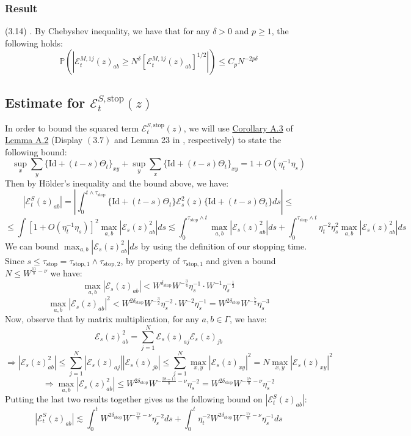 \documentclass[11pt]{article}
\newcommand{\E}{\mathcal{E}}
\newcommand{\sto}{\text{stop}}
\begin{document}
\subsubsection*{Result}
(3.14) \cite{bandSDE}. By Chebyshev inequality, we have that for any $\delta>0$ and $p\geq 1$, the following holds: 
$$\mathbb{P}\left(\left\vert \E_t^{M, 1j}(z)_{ab}\geq N^\delta [\E_t^{M, 1j}(z)_{ab}]^{1/2}\right\vert\right)\leq C_p N^{-2p\delta}$$

\subsection{Estimate for $\E_t^{S, \text{stop}}(z)$}

In order to bound the squared term $\E_t^{S, \sto}(z)$, we will use \hyperref[cor-a3]{Corollary A.3} of \hyperref[lemma-a2]{Lemma A.2} (Display $(3.7)$ and Lemma 23 in \cite{bandSDE}, respectively) to state the following  bound: $$\sup_x \sum_y \{\text{Id}+(t-s)\Theta_t\}_{xy}+\sup_y \sum_x \{\text{Id}+(t-s)\Theta_t\}_{xy} = 1+O(\eta_t^{-1}\eta_s)$$
Then by Hölder's inequality and the bound above, we have: $$|\E_t^{S}(z)_{ab}|=\left\vert\int_0^{t\wedge \tau_\sto} \{\text{Id} + (t-s)\Theta_t\}\E_s^2(z) \{\text{Id} + (t-s)\Theta_t\}ds\right\vert \leq$$
$$\leq \int \left[1+O(\eta_t^{-1}\eta_s)\right]^2 \max_{a, b}|\E_s(z)_{ab}^2|ds \lesssim \int_0^{\tau_\sto \wedge t} \max_{a, b}|\E_s(z)_{ab}^2|ds + \int_0^{\tau_\sto \wedge t}\eta_t^{-2}\eta_s^{2} \max_{a, b}|\E_s(z)^2_{ab}|ds$$
We can bound $\max_{a, b}|\E_s(z)_{ab}^2|ds$ by using the definition of our stopping time. Since $s\leq \tau_\sto = \tau_{\sto, 1}\wedge \tau_{\sto, 2}$, by property of $\tau_{\sto, 1}$ and given a bound $N\leq W^{\frac{11}{8}-\nu}$ we have: $$\max_{a, b}|\E_s(z)_{ab}|<W^{\delta_\sto} W^{-\frac{3}{4}} \eta_s^{-1}\cdot W^{-1}\eta_s^{-\frac{1}{2}}$$
$$\max_{a, b}|\E_s(z)_{ab}|^2<W^{2\delta_\sto} W^{-\frac{3}{2}} \eta_s^{-2}\cdot W^{-2}\eta_s^{-1}=W^{2\delta_{\sto}} W^{-\frac{7}{2}}\eta_s^{-3} $$
Now, observe that by matrix multiplication, for any $a, b\in \Gamma$, we have: $$\E_s(z)^2_{ab} = \sum_{j=1}^N \E_s(z)_{aj}\E_s(z)_{jb}$$
$$\Rightarrow |\E_s(z)_{ab}^2|\leq \sum_{j=1}^N |\E_s(z)_{aj}||\E_s(z)_{jb}|\leq \sum_{j=1}^N \max_{x,y}|\E_s(z)_{xy}|^2 = N\max_{x,y}|\E_s(z)_{xy}|^2$$
$$\Rightarrow \max_{a,b}|\E_s(z)^2_{ab}|\leq W^{2\delta_\sto}W^{-\frac{28-11}{8}-\nu}\eta_s^{-2} = W^{2\delta_\sto}W^{-\frac{17}{8}-\nu}\eta_s^{-2}$$
Putting the last two results together gives us the following bound on $|\E_t^S(z)_{ab}|$:
$$|\E_t^S(z)_{ab}|\lesssim \int_0^t W^{2\delta_\sto}W^{-\frac{17}{8}-\nu}\eta_s^{-2}ds + \int_0^t \eta_t^{-2}W^{2\delta_\sto}W^{-\frac{17}{8}-\nu}\eta_s^{-1}ds$$
\end{document}
